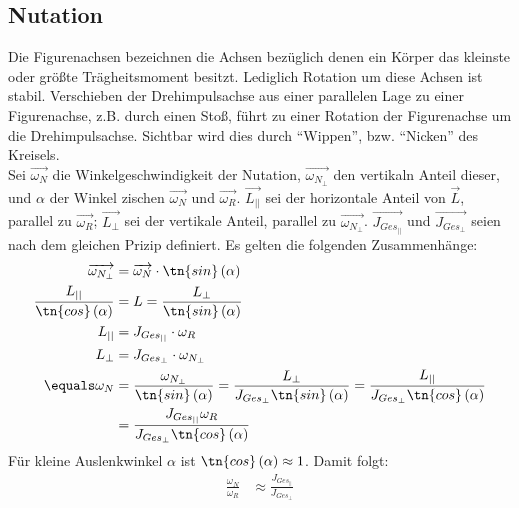 \documentclass[12pt, a4paper, twoside]{scrartcl}
\begin{document}
\subsection{Nutation}
Die Figurenachsen bezeichnen die Achsen bezüglich denen ein Körper das kleinste oder größte Trägheitsmoment besitzt. Lediglich Rotation um diese Achsen ist stabil. Verschieben der Drehimpulsachse aus einer parallelen Lage zu einer Figurenachse, z.B. durch einen Stoß, führt zu einer Rotation der Figurenachse um die Drehimpulsachse. Sichtbar wird dies durch ``Wippen'', bzw. ``Nicken'' des Kreisels.  \\
Sei $\overrightarrow{\omega_N}$ die Winkelgeschwindigkeit der Nutation, $\overrightarrow{\omega_{N_{\perp}}}$ den vertikaln Anteil dieser, und $\alpha$ der Winkel zischen $\overrightarrow{\omega_N}$ und $\overrightarrow{\omega_R}$. $\overrightarrow{L_{||}}$ sei der horizontale Anteil von $\overrightarrow{L}$, parallel zu $\overrightarrow{\omega_R}$; $\overrightarrow{L_{\perp}}$ sei der vertikale Anteil, parallel zu $\overrightarrow{\omega_{N_{\perp}}}$. $\overrightarrow{J_{{Ges}_{||}}}$ und $\overrightarrow{J_{{Ges}_{\perp}}}$ seien nach dem gleichen Prizip definiert. Es gelten die folgenden Zusammenhänge:\\
\begin{align*}
 \overrightarrow{\omega_{N_{\perp}}} &= \overrightarrow{\omega_N} \cdot \tn{sin} \left( \alpha \right) \\
 \frac{L_{||}}{\tn{cos} \left( \alpha \right)} &= L = \frac{L_{\perp}}{\tn{sin} \left( \alpha \right)} \\
 L_{||} &= J_{{Ges}_{||}} \cdot \omega_R \\
 L_{\perp} &= J_{{Ges}_{\perp}} \cdot \omega_{N_{\perp}} \\
 \equals \omega_N &= \frac{\omega_{N_{\perp}}}{\tn{sin} \left( \alpha \right)} = \frac{L_{\perp}}{J_{{Ges}_{\perp}}\tn{sin} \left( \alpha \right)} = \frac{L_{||}}{J_{{Ges}_{\perp}} \tn{cos} \left( \alpha \right)}\\
 &= \frac{J_{{Ges}_{||}} \omega_R}{J_{{Ges}_{\perp}} \tn{cos} \left( \alpha \right)}
\end{align*}
Für kleine Auslenkwinkel $\alpha$ ist $\tn{cos} \left( \alpha \right) \approx 1$. Damit folgt:\\
\begin{align}
\label{eq:nutation}
 \frac{\omega_N}{\omega_R} &\approx \frac{J_{{Ges}_{||}}}{J_{{Ges}_{\perp}}}
\end{align}
\end{document}
